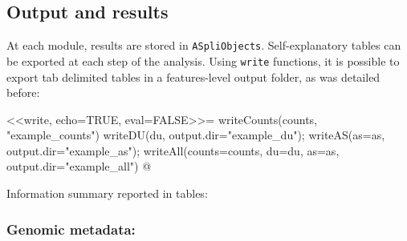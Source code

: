 \documentclass{article}
\begin{document}
\subsection{Output and results} \label{sec:output}
At each module, results are stored in \texttt{ASpliObjects}. Self-explanatory tables can be exported at each step of the analysis. Using \texttt{write} functions, it is possible to export tab delimited tables in a features-level output folder, as was detailed before:

<<write, echo=TRUE, eval=FALSE>>=
writeCounts(counts, "example_counts")
writeDU(du, output.dir="example_du");
writeAS(as=as, output.dir="example_as");
writeAll(counts=counts, du=du, as=as, output.dir="example_all")
@

Information summary reported in tables:
\subsubsection*{Genomic metadata:}
\end{document}
